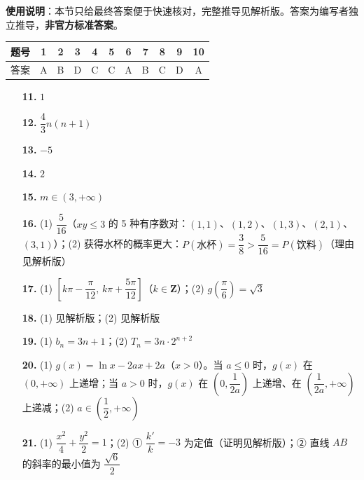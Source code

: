 
\begin{gknotice}
\textbf{使用说明}：本节只给最终答案便于快速核对，完整推导见解析版。答案为编写者独立推导，\textbf{非官方标准答案}。
\end{gknotice}

\begin{center}\begin{tabular}{ccccccccccc}
\toprule
题号 & 1 & 2 & 3 & 4 & 5 & 6 & 7 & 8 & 9 & 10 \\
\midrule
答案 & A & B & D & C & C & A & B & C & D & A \\
\bottomrule
\end{tabular}\end{center}

\begin{itemize}[leftmargin=2.6em]
  \item[\textbf{11.}] \(1\)
  \item[\textbf{12.}] \(\dfrac{4}{3}n(n+1)\)
  \item[\textbf{13.}] \(-5\)
  \item[\textbf{14.}] \(2\)
  \item[\textbf{15.}] \(m\in(3,+\infty)\)
\end{itemize}

\begin{itemize}[leftmargin=2.6em]
  \item[\textbf{16.}] (1) \(\dfrac{5}{16}\)（\(xy\leqslant 3\) 的 5 种有序数对：\((1,1)\)、\((1,2)\)、\((1,3)\)、\((2,1)\)、\((3,1)\)）；(2) 获得水杯的概率更大：\(P(\text{水杯})=\dfrac{3}{8}>\dfrac{5}{16}=P(\text{饮料})\)（理由见解析版）
  \item[\textbf{17.}] (1) \(\left[k\pi-\dfrac{\pi}{12},\,k\pi+\dfrac{5\pi}{12}\right]\)（\(k\in\mathbf{Z}\)）；(2) \(g\left(\dfrac{\pi}{6}\right)=\sqrt{3}\)
  \item[\textbf{18.}] (1) 见解析版；(2) 见解析版
  \item[\textbf{19.}] (1) \(b_{n}=3n+1\)；(2) \(T_{n}=3n\cdot 2^{n+2}\)
  \item[\textbf{20.}] (1) \(g(x)=\ln x-2ax+2a\)（\(x>0\)）。当 \(a\leqslant 0\) 时，\(g(x)\) 在 \((0,+\infty)\) 上递增；当 \(a>0\) 时，\(g(x)\) 在 \(\left(0,\dfrac{1}{2a}\right)\) 上递增、在 \(\left(\dfrac{1}{2a},+\infty\right)\) 上递减；(2) \(a\in\left(\dfrac{1}{2},+\infty\right)\)
  \item[\textbf{21.}] (1) \(\dfrac{x^{2}}{4}+\dfrac{y^{2}}{2}=1\)；(2) ① \(\dfrac{k'}{k}=-3\) 为定值（证明见解析版）；② 直线 \(AB\) 的斜率的最小值为 \(\dfrac{\sqrt{6}}{2}\)
\end{itemize}
